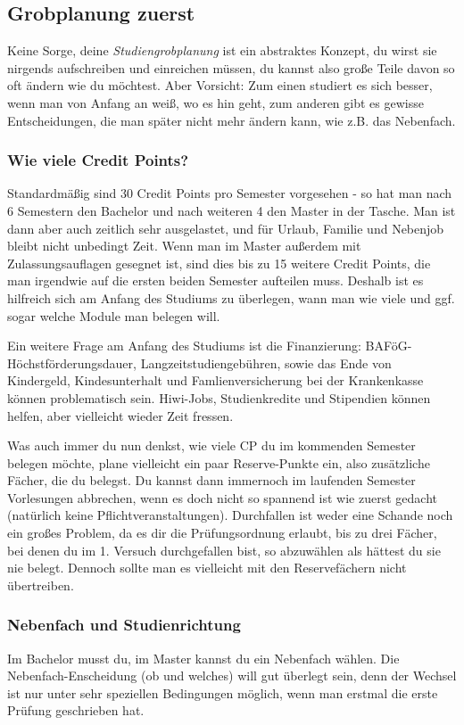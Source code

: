 \subsection{Grobplanung zuerst}
\label{grob}
	Keine Sorge, deine \textit{Studiengrobplanung} ist ein abstraktes Konzept, du wirst sie nirgends aufschreiben und einreichen müssen, du kannst also große Teile davon so oft ändern wie du möchtest. Aber Vorsicht: Zum einen studiert es sich besser, wenn man von Anfang an weiß, wo es hin geht, zum anderen gibt es gewisse Entscheidungen, die man später nicht mehr ändern kann, wie z.B. das Nebenfach.

\subsubsection{Wie viele Credit Points?}
	Standardmäßig sind 30 Credit Points pro Semester vorgesehen - so hat man nach 6 Semestern den Bachelor und nach weiteren 4 den Master in der Tasche. Man ist dann aber auch zeitlich sehr ausgelastet, und für Urlaub, Familie und Nebenjob bleibt nicht unbedingt Zeit. Wenn man im Master außerdem mit Zulassungsauflagen gesegnet ist, sind dies bis zu 15 weitere Credit Points, die man irgendwie auf die ersten beiden Semester aufteilen muss. Deshalb ist es hilfreich sich am Anfang des Studiums zu überlegen, wann man wie viele und ggf. sogar welche Module man belegen will.

	Ein weitere Frage am Anfang des Studiums ist die Finanzierung:
	BAFöG-Höchstförderungsdauer, Langzeitstudiengebühren, sowie das
	Ende von Kindergeld, Kindesunterhalt und Famlienversicherung bei
	der Krankenkasse können problematisch sein. Hiwi-Jobs,
	Studienkredite und Stipendien können helfen, aber vielleicht
	wieder Zeit fressen. 

	Was auch immer du nun denkst, wie viele CP du im kommenden Semester belegen möchte, plane vielleicht ein paar Reserve-Punkte ein, also zusätzliche Fächer, die du belegst. Du kannst dann immernoch im laufenden Semester Vorlesungen abbrechen, wenn es doch nicht so spannend ist wie zuerst gedacht (natürlich keine Pflichtveranstaltungen). Durchfallen ist weder eine Schande noch ein großes Problem, da es dir die Prüfungsordnung erlaubt, bis zu drei Fächer, bei denen du im 1. Versuch durchgefallen bist, so abzuwählen als hättest du sie nie belegt. Dennoch sollte man es vielleicht mit den Reservefächern nicht übertreiben.

\subsubsection{Nebenfach und Studienrichtung}
\label{nebenfach}
	Im Bachelor musst du, im Master kannst du ein Nebenfach wählen. Die Nebenfach-Enscheidung (ob und welches) will gut überlegt sein, denn der Wechsel ist nur unter sehr speziellen Bedingungen möglich, wenn man erstmal die erste Prüfung geschrieben hat.
 

